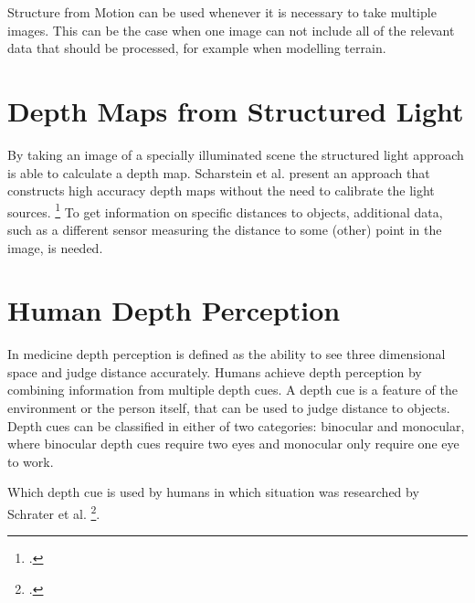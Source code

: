 Structure from Motion can be used whenever it is necessary to take multiple images. This can be the case when one image can not include all of the relevant data that should be processed, for example when modelling terrain.

\newpage

\section{Depth Maps from Structured Light}
By taking an image of a specially illuminated scene the structured light approach is able to calculate a depth map. Scharstein et al. present an approach that constructs high accuracy depth maps without the need to calibrate the light sources. \footcite{Scharstein_High-accuracy_stereo_depth_maps_using_structured_light} To get information on specific distances to objects, additional data, such as a different sensor measuring the distance to some (other) point in the image, is needed.

\section{Human Depth Perception}
\label{sec:studyOfLiterature_humanDepthPerception}

In medicine depth perception is defined as the ability to see three dimensional space and judge distance accurately. Humans achieve depth perception by combining information from multiple depth cues. A depth cue is a feature of the environment or the person itself, that can be used to judge distance to objects. Depth cues can be classified in either of two categories: binocular and monocular, where binocular depth cues require two eyes and monocular only require one eye to work.

Which depth cue is used by humans in which situation was researched by Schrater et al. \footcite{Schrater_How_optimal_depth_cue_integration_depends_on_the_task}.

